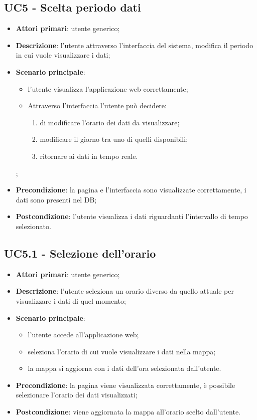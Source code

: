 \subsection{UC5 - Scelta periodo dati}
\begin{itemize}
\item \textbf{Attori primari}: utente generico;
\item \textbf{Descrizione}: l’utente attraverso l’interfaccia del sistema, modifica il periodo in cui vuole visualizzare i dati;
\item \textbf{Scenario principale}: 
	\begin{itemize}
		\item l’utente visualizza l’applicazione web correttamente;
		\item Attraverso l’interfaccia l’utente può decidere:
			\begin{enumerate}
				\item di modificare l’orario dei dati da visualizzare;
				\item modificare il giorno tra uno di quelli disponibili;
				\item ritornare ai dati in tempo reale.
			\end{enumerate}
	\end{itemize};
\item \textbf{Precondizione}: la pagina e l’interfaccia sono visualizzate correttamente, i dati sono presenti nel DB;
\item \textbf{Postcondizione}: l’utente visualizza i dati riguardanti l’intervallo di tempo selezionato.
\end{itemize}

\subsection{UC5.1 - Selezione dell'orario}
\begin{itemize}
	\item \textbf{Attori primari}: utente generico;
	\item \textbf{Descrizione}: l’utente seleziona un orario diverso da quello attuale per visualizzare i dati di quel momento;
	\item \textbf{Scenario principale}:
		\begin{itemize}
			\item l’utente accede all’applicazione web;
			\item seleziona l’orario di cui vuole visualizzare i dati nella mappa;
			\item la mappa si aggiorna con i dati dell’ora selezionata dall’utente.
		\end{itemize}
	\item \textbf{Precondizione}: la pagina viene visualizzata correttamente, è possibile selezionare l’orario dei dati visualizzati;
	\item \textbf{Postcondizione}: viene aggiornata la mappa all’orario scelto dall’utente.
\end{itemize}

